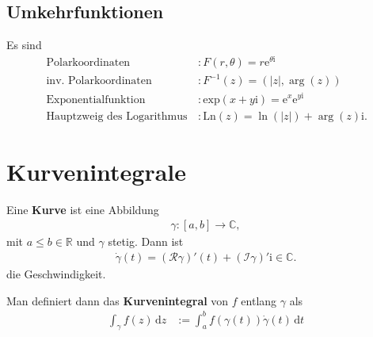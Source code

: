 \documentclass[a4paper,12pt]{article}
\newcommand{\td}{\,\text{d}}
\numberwithin{equation}{section}
\begin{document}
\subsection{Umkehrfunktionen}
Es sind
\begin{align} 
        \,\text{Polarkoordinaten}\,&:F\left(r,\theta \right)=r\text{e}^{\theta \text{i}}\\
        \,\text{inv.\ Polarkoordinaten}\,&:F^{-1}\left(z\right)=\left(|z|,\arg\left(z\right)\right)\\
        \,\text{Exponentialfunktion}\,&:\text{exp}\left(x+y\text{i}\right)=\text{e}^{x}\text{e}^{y\text{i}}\\
        \,\text{Hauptzweig des Logarithmus}\,&:\text{Ln}\left(z\right)=\ln\left(|z|\right)+\arg\left(z\right)\text{i}
.\end{align} 

\newpage
\section{Kurvenintegrale}
Eine \textbf{Kurve} ist eine Abbildung
\begin{align} 
        \gamma :\left[a,b\right]\rightarrow \mathbb{C}
,\end{align} 
mit $a\leq b \in \mathbb{R}$ und $\gamma $ stetig. Dann ist 
\begin{align} 
        \dot{\gamma }\left(t\right)=\left(\mathcal{R}\gamma \right)'\left(t\right)+\left(\mathcal{I}\gamma \right)'\text{i} \in \mathbb{C}
.\end{align} 
die Geschwindigkeit.\par
Man definiert dann das \textbf{Kurvenintegral} von $f$ entlang $\gamma $ als
\begin{align} 
        \int_{\gamma }^{}f\left(z\right)\td z&:=\int_{a}^{b}f\left(\gamma \left(t\right)\right)\dot{\gamma }\left(t\right)\td t
\end{align} 


\end{document}
